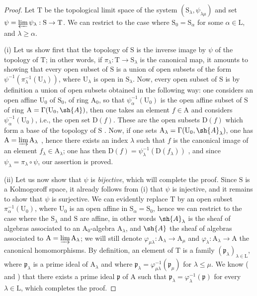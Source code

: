 \begin{proof}
Let $\mathrm{T}$ be the topological limit space of the system $(\mathrm{S}_\lambda,\psi_{\lambda\mu})$ and set $\psi=\varprojlim\psi_\lambda:\mathrm{S}\to\mathrm{T}$.
We can restrict to the case where $\mathrm{S}_0=\mathrm{S}_\alpha$ for some $\alpha\in\mathrm{L}$, and $\lambda\geqslant\alpha$.

\medskip
\noindent
(i) Let us show first that the topology of $\mathrm{S}$ is the inverse image by $\psi$ of the topology of $\mathrm{T}$; in other words, if $\pi_\lambda:\mathrm{T}\to\mathrm{S}_\lambda$ is the canonical map, it amounts to showing that every open subset of $\mathrm{S}$ is a union of open subsets of the form $\psi^{-1}(\pi_\lambda^{-1}(\mathrm{U}_\lambda))$, where $\mathrm{U}_\lambda$ is open in $\mathrm{S}_\lambda$.
Now, every open subset of $\mathrm{S}$ is by definition a union of open subsets obtained in the following way: one considers an open affine $\mathrm{U}_0$ of $\mathrm{S}_0$, of ring $\mathrm{A}_0$, so that $\psi_\alpha^{-1}(\mathrm{U}_0)$ is the open affine subset of $\mathrm{S}$ of ring $\mathrm{A}=\Gamma(\mathrm{U}_0,\sh{A})$, then one takes an element $f\in\mathrm{A}$ and considers $\psi_\alpha^{-1}(\mathrm{U}_0)$, i.e., the open set $\mathrm{D}(f)$.
These are the open subsets $\mathrm{D}(f)$ which form a base of the topology of $\mathrm{S}$ .
Now, if one sets $\mathrm{A}_\lambda=\Gamma(\mathrm{U}_0,\sh{A}_\lambda)$, one has $\mathrm{A}=\varinjlim\mathrm{A}_\lambda$ , hence there exists an index $\lambda$ such that $f$ is the canonical image of an element $f_\lambda\in\mathrm{A}_\lambda$; one has then $\mathrm{D}(f)=\psi_\lambda^{-1}(\mathrm{D}(f_\lambda))$ , and since $\psi_\lambda=\pi_\lambda\circ\psi$, our assertion is proved.

\medskip
\noindent
(ii) Let us now show that $\psi$ is \emph{bijective}, which will complete the proof.
Since $\mathrm{S}$ is a Kolmogoroff space, it already follows from (i) that $\psi$ is injective, and it remains to show that $\psi$ is surjective.
We can evidently replace $\mathrm{T}$ by an open subset $\pi_\alpha^{-1}(\mathrm{U}_0)$, where $\mathrm{U}_0$ is an open affine in $\mathrm{S}_\alpha=\mathrm{S}_0$, hence we can restrict to the case where the $\mathrm{S}_\lambda$ and $\mathrm{S}$ are affine, in other words $\sh{A}_\lambda$ is the sheaf of algebras associated to an $\mathrm{A}_0$-algebra $\mathrm{A}_\lambda$, and $\sh{A}$ the sheaf of algebras associated to $\mathrm{A}=\varinjlim\mathrm{A}_\lambda$; we will still denote $\varphi_{\mu\lambda}:\mathrm{A}_\lambda\to\mathrm{A}_\mu$ and $\varphi_\lambda:\mathrm{A}_\lambda\to\mathrm{A}$ the canonical homomorphisms.
By definition, an element of $\mathrm{T}$ is a family $(\mathfrak{p}_\lambda)_{\lambda\in\mathrm{L}}$, where $\mathfrak{p}_\lambda$ is a prime ideal of $\mathrm{A}_\lambda$ and where $\mathfrak{p}_\lambda=\varphi_{\mu\lambda}^{-1}(\mathfrak{p}_\mu)$ for $\lambda\leqslant\mu$.
We know ( and ) that there exists a prime ideal $\mathfrak{p}$ of $\mathrm{A}$ such that $\mathfrak{p}_\lambda=\varphi_\lambda^{-1}(\mathfrak{p})$ for every $\lambda\in\mathrm{L}$, which completes the proof.
\end{proof}

